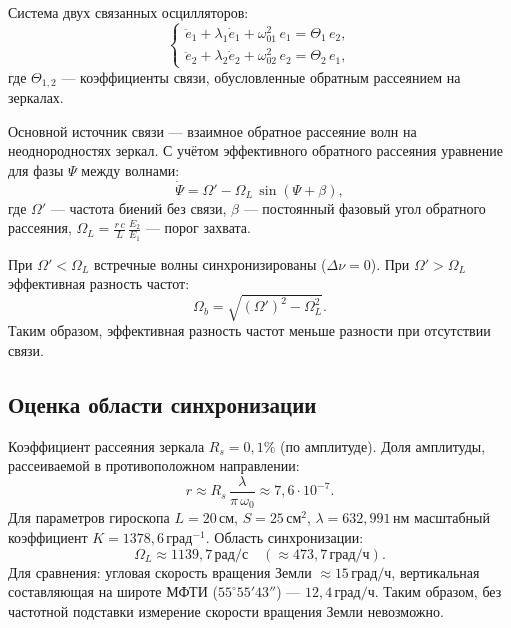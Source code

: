 \documentclass[12pt, a4paper]{article}
\newcommand{\unit}[1]{\text{#1}}
\begin{document}
Система двух связанных осцилляторов:
\begin{equation}
    \begin{cases}
        \ddot{e}_1 + \lambda_1 \dot{e}_1 + \omega_{01}^2\, e_1 = \Theta_1\, e_2, \\
        \ddot{e}_2 + \lambda_2 \dot{e}_2 + \omega_{02}^2\, e_2 = \Theta_2\, e_1,
    \end{cases}
\end{equation}
где $\Theta_{1,2}$ --- коэффициенты связи, обусловленные обратным рассеянием на зеркалах.

Основной источник связи --- взаимное обратное рассеяние волн на неоднородностях зеркал. С учётом эффективного обратного рассеяния уравнение для фазы $\Psi$ между волнами:
\begin{equation}
    \dot{\Psi} = \Omega' - \Omega_L\,\sin(\Psi + \beta),
\end{equation}
где $\Omega'$ --- частота биений без связи, $\beta$ --- постоянный фазовый угол обратного рассеяния, $\Omega_L = \frac{r\,c}{L}\,\frac{E_2}{E_1}$ --- порог захвата.

При $\Omega' < \Omega_L$ встречные волны синхронизированы ($\Delta \nu = 0$). При $\Omega' > \Omega_L$ эффективная разность частот:
\begin{equation}
    \Omega_b = \sqrt{(\Omega')^2 - \Omega_L^2}.
\end{equation}
Таким образом, эффективная разность частот меньше разности при отсутствии связи.

\subsection*{Оценка области синхронизации}
Коэффициент рассеяния зеркала $R_s = 0{,}1\%$ (по амплитуде). Доля амплитуды, рассеиваемой в противоположном направлении:
\begin{equation}
    r \approx R_s\,\frac{\lambda}{\pi\,\omega_0} \approx 7{,}6 \cdot 10^{-7}.
\end{equation}
Для параметров гироскопа $L = 20\,\unit{см}$, $S = 25\,\unit{см}^2$, $\lambda = 632{,}991\,\unit{нм}$ масштабный коэффициент $K = 1378{,}6\,\unit{град}^{-1}$. Область синхронизации:
\begin{equation}
    \Omega_L \approx 1139{,}7\,\unit{рад/с} \quad (\approx 473{,}7\,\unit{град/ч}).
\end{equation}
Для сравнения: угловая скорость вращения Земли $\approx 15\,\unit{град/ч}$, вертикальная составляющая на широте МФТИ ($55^\circ 55' 43''$) --- $12{,}4\,\unit{град/ч}$. Таким образом, без частотной подставки измерение скорости вращения Земли невозможно.
\end{document}
